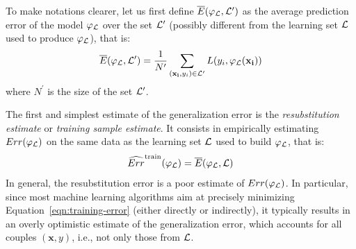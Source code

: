 To make notations clearer, let us first define $\overline{E}(\varphi_{\cal L}, {\cal
L}^\prime)$\label{ntn:E_bar} as the average prediction error of the model $\varphi_{\cal L}$ over the set
${\cal L}^\prime$ (possibly different from the learning set ${\cal L}$ used to produce
$\varphi_{\cal L}$), that is:
\begin{equation}
\overline{E}(\varphi_{\cal L}, {\cal L}^\prime) = \frac{1}{N^\prime} \sum_{(\mathbf{x_i}, y_i) \in {\cal L}^\prime} L(y_i, \varphi_{\cal L}(\mathbf{x_i}))
\end{equation}
where $N^\prime$ is the size of the set ${\cal L}^\prime$.

The first and simplest estimate of the generalization error is the
\textit{resubstitution estimate} or \textit{training sample estimate}. It
consists in empirically estimating $Err(\varphi_{\cal L})$ on the same data as
the learning set ${\cal L}$ used to build $\varphi_{\cal L}$, that is:
\begin{equation}\label{eqn:training-error}
\widehat{Err}^\text{train}(\varphi_{\cal L}) = \overline{E}(\varphi_{\cal L}, {\cal L})
\end{equation}
In general, the resubstitution error is a poor estimate of $Err(\varphi_{\cal L})$.
In particular, since most machine learning algorithms aim at
precisely minimizing Equation~\ref{eqn:training-error} (either directly or
indirectly), it typically results in an overly optimistic estimate of the
generalization error, which accounts for all couples $(\mathbf{x}, y)$, i.e.,
not only those from ${\cal L}$.

